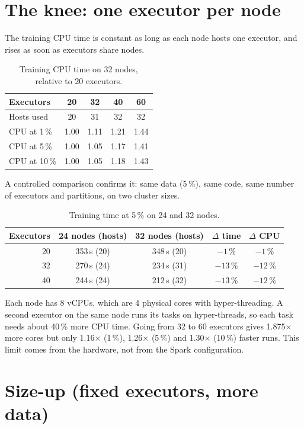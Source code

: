\documentclass[a4paper, 11pt]{article}
\begin{document}
\section{The knee: one executor per node}

The training CPU time is constant as long as each node hosts one executor, and rises as soon as
executors share nodes.

\begin{table}[H]
\centering
\begin{tabular}{lcccc}
\toprule
Executors & 20 & 32 & 40 & 60 \\
\midrule
Hosts used & 20 & 31 & 32 & 32 \\
CPU at 1\,\%  & 1.00 & 1.11 & 1.21 & 1.44 \\
CPU at 5\,\%  & 1.00 & 1.05 & 1.17 & 1.41 \\
CPU at 10\,\% & 1.00 & 1.05 & 1.18 & 1.43 \\
\bottomrule
\end{tabular}
\caption{Training CPU time on 32 nodes, relative to 20 executors.}
\end{table}

A controlled comparison confirms it: same data (5\,\%), same code, same number of executors and
partitions, on two cluster sizes.

\begin{table}[H]
\centering
\begin{tabular}{rcccc}
\toprule
Executors & 24 nodes (hosts) & 32 nodes (hosts) & $\Delta$ time & $\Delta$ CPU \\
\midrule
20 & 353\,s (20) & 348\,s (20) & $-1$\,\%  & $-1$\,\% \\
32 & 270\,s (24) & 234\,s (31) & $-13$\,\% & $-12$\,\% \\
40 & 244\,s (24) & 212\,s (32) & $-13$\,\% & $-12$\,\% \\
\bottomrule
\end{tabular}
\caption{Training time at 5\,\% on 24 and 32 nodes.}
\end{table}

Each node has 8 vCPUs, which are 4 physical cores with hyper-threading. A second executor on the same
node runs its tasks on hyper-threads, so each task needs about 40\,\% more CPU time. Going from 32 to
60 executors gives 1.875$\times$ more cores but only 1.16$\times$ (1\,\%), 1.26$\times$ (5\,\%) and
1.30$\times$ (10\,\%) faster runs. This limit comes from the hardware, not from the Spark configuration.

\section{Size-up (fixed executors, more data)}
\end{document}
